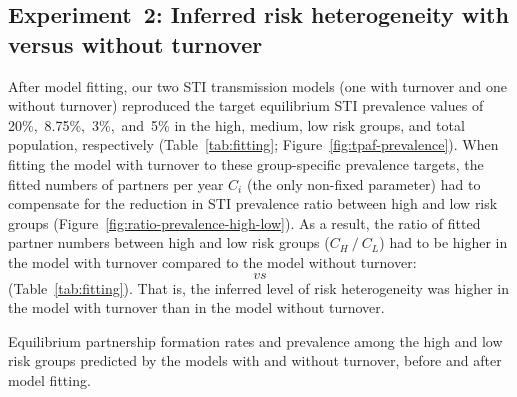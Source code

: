 \subsection{Experiment~2: Inferred risk heterogeneity with versus without turnover}
\label{ss:res-infer}
After model fitting,
our two STI transmission models
(one with turnover and one without turnover)
reproduced the target equilibrium STI prevalence values of 20\%,~8.75\%,~3\%,~and~5\%
in the high, medium, low risk groups, and total population, respectively
(Table~\ref{tab:fitting}; Figure~\ref{fig:tpaf-prevalence}).
When fitting the model with turnover to these group-specific prevalence targets,
the fitted numbers of partners per year $C_i$ (the only non-fixed parameter)
had to compensate for the reduction in
STI prevalence ratio between high and low risk groups
(Figure~\ref{fig:ratio-prevalence-high-low}).
As a result, the ratio of fitted partner numbers
between high and low risk groups ($C_H~/~C_L$)
had to be higher in the model with turnover compared to the model without turnover:
$$~vs~%
$$
(Table~\ref{tab:fitting}).
That is, the inferred level of risk heterogeneity was higher
in the model with turnover than in the model without turnover.
\begin{table}
  \caption{Equilibrium partnership formation rates and prevalence
    among the high and low risk groups
    predicted by the models with and without turnover,
    before and after model fitting.}
  \label{tab:fitting}
  
\end{table}
